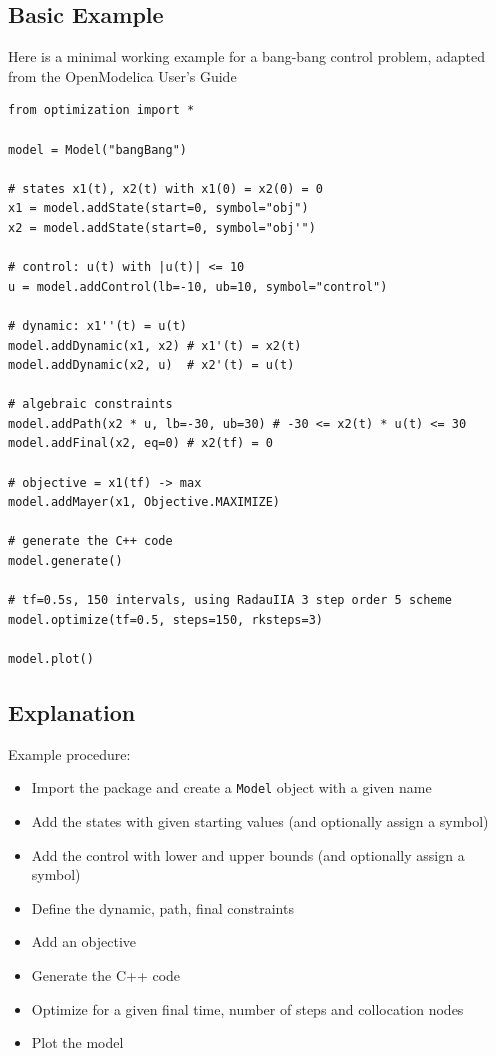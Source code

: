 \documentclass[12pt]{article}
\begin{document}
\subsection{Basic Example}
Here is a minimal working example for a bang-bang control problem, adapted from the OpenModelica User's Guide \cite{openmodelica}
\begin{lstlisting}
from optimization import *

model = Model("bangBang")

# states x1(t), x2(t) with x1(0) = x2(0) = 0
x1 = model.addState(start=0, symbol="obj") 
x2 = model.addState(start=0, symbol="obj'")

# control: u(t) with |u(t)| <= 10
u = model.addControl(lb=-10, ub=10, symbol="control") 

# dynamic: x1''(t) = u(t)
model.addDynamic(x1, x2) # x1'(t) = x2(t)
model.addDynamic(x2, u)  # x2'(t) = u(t)

# algebraic constraints
model.addPath(x2 * u, lb=-30, ub=30) # -30 <= x2(t) * u(t) <= 30
model.addFinal(x2, eq=0) # x2(tf) = 0

# objective = x1(tf) -> max
model.addMayer(x1, Objective.MAXIMIZE) 

# generate the C++ code
model.generate() 

# tf=0.5s, 150 intervals, using RadauIIA 3 step order 5 scheme
model.optimize(tf=0.5, steps=150, rksteps=3)

model.plot()
	\end{lstlisting}

\subsection{Explanation}
Example procedure:
\begin{itemize}
	\item Import the package and create a \texttt{Model} object
	      with a given name
	\item Add the states with given starting values (and optionally
	      assign a symbol)
	\item Add the control with lower and upper bounds (and
	      optionally assign a symbol)
	\item Define the dynamic, path, final constraints
	\item Add an objective
	\item Generate the C++ code
	\item Optimize for a given final time, number of steps and
	      collocation nodes
	\item Plot the model
\end{itemize}
\end{document}
